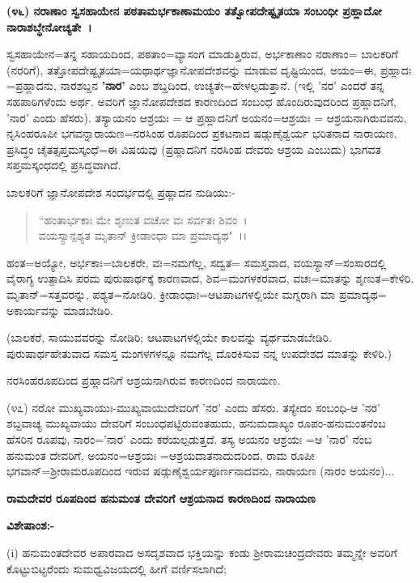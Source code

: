 \textbf{(೪೬) ನರಾಣಾಂ ಸ್ವಸಹಾಯೇನ ಪಠತಾಮರ್ಭಕಾಣಾಮಯಂ ತತ್ವೋಪದೇಷ್ಟೃತಯಾ ಸಂಬಂಧೀ ಪ್ರಹ್ಲಾದೋ ನಾರಾಶಬ್ಧೇನೋಚ್ಯತೇ~।}

ಸ್ವಸಹಾಯೇನ=ತನ್ನ ಸಹಾಯದಿಂದ, ಪಠತಾಂ=ವ್ಯಾಸಂಗ ಮಾಡುತ್ತಿರುವ, ಅರ್ಭಕಾಣಾಂ ನರಾಣಾಂ= ಬಾಲಕರಿಗೆ (ನರರಿಗೆ), ತತ್ತೋಪದೇಷ್ಟೃತಯಾ=ಯಥಾರ್ಥಜ್ಞಾನೋಪದೇಶವನ್ನು ಮಾಡುವ ದೃಷ್ಟಿಯಿಂದ, ಅಯಂ=ಈ, ಪ್ರಹ್ಲಾದಃ =ಪ್ರಹ್ಲಾದನು, ನಾರಶಬ್ದನ \textbf{'ನಾರ'} ಎಂಬ ಶಬ್ದದಿಂದ, ಉಚ್ಯತೇ=ಹೇಳಲ್ಪಡುತ್ತಾನೆ. (ಇಲ್ಲಿ 'ನರ' ಎಂದರೆ ತನ್ನ ಸಹಪಾಠಿಗಳೆಂದು ಅರ್ಥ. ಅವರಿಗೆ ಜ್ಞಾನೋಪದೇಶದ ಕಾರಣದಿಂದ ಸಂಬಂಧ ಹೊಂದಿರುವುದರಿಂದ ಪ್ರಹ್ಲಾದನಿಗೆ, 'ನಾರ' ಎಂದು ಹೆಸರು). ತಸ್ಯಾಯನಂ ಆಶ್ರಯಃ = ಆ ಪ್ರಹ್ಲಾದನಿಗೆ ಅಯನಂ=ಆಶ್ರಯಃ = ಆಶ್ರಯನಾಗಿರುವವನು, ನೃಸಿಂಹರೂಪೀ ಭಗವನ್ನಾರಾಯಣ=ನರಸಿಂಹ ರೂಪದಿಂದ ಪ್ರಕಟನಾದ ಷಡ್ಗುಣೈಶ್ವರ್ಯ ಭರಿತನಾದ ನಾರಾಯಣ. ಪ್ರಸಿದ್ಧಂ ಚೈತತ್ಸಪ್ತಮಸ್ಕಂಧೆ=ಈ ವಿಷಯವು (ಪ್ರಹ್ಲಾದನಿಗೆ ನರಸಿಂಹ ದೇವರು ಆಶ್ರಯ ಎಂಬುದು) ಭಾಗವತ ಸಪ್ತಮಸ್ಕಂಧದಲ್ಲಿ ಪ್ರಸಿದ್ಧವಾಗಿದೆ.

ಬಾಲಕರಿಗೆ ಜ್ಞಾನೋಪದೇಶ ಸಂದರ್ಭದಲ್ಲಿ ಪ್ರಹ್ಲಾದನ ನುಡಿಯು:-

\begin{verse}
``ಹಂತಾರ್ಭಕಾಃ ಮೇ ಶೃಣುತ ವಚೋ ವಃ ಸರ್ವತಃ ಶಿವಂ~।\\ ವಯಸ್ಯಾನ್ಪಶ್ಯತ ಮೃತಾನ್ ಕ್ರೀಡಾಂಧಾ ಮಾ ಪ್ರಮಾದ್ಯಥ"~।।
\end{verse}

ಹಂತ=ಅಯ್ಯೋ, ಅರ್ಭಕಾಃ=ಬಾಲಕರೇ, ವಃ=ನಮಗೆಲ್ಲ, ಸದ್ವತ= ಸಮಸ್ತವಾದ, ವಯಸ್ಯಾನ್=ಸಂಸಾರದಲ್ಲಿ ವೈರಾಗ್ಯ ಉತ್ಪಾದಿಸಿ ಪರಮ ಪುರುಷಾರ್ಥಕ್ಕೆ ಕಾರಣವಾದ, ಶಿವ=ಮಂಗಳಕರವಾದ, ವಚಃ=ಮಾತನ್ನು ಶೃಣುತ=ಕೇಳಿರಿ. ಮೃತಾನ್=ಸತ್ತವರನ್ನು, ಪಶ್ಯತ=ನೋಡಿರಿ. ಕ್ರೀಡಾಂಧಾಃ=ಆಟಪಾಟಗಳಲ್ಲಿಯೇ ಮಗ್ನರಾಗಿ ಮಾ ಪ್ರಮಾದ್ಯಥ= ಅಕಾರ್ಯವನ್ನು ಮಾಡಬೇಡಿರಿ.

(ಬಾಲಕರೆ, ಸಾಯುವವರನ್ನು ನೋಡಿರಿ; ಆಟಪಾಟಗಳಲ್ಲಿಯೇ ಕಾಲವನ್ನು ವ್ಯರ್ಥಮಾಡಬೇಡಿರಿ. ಪುರುಷಾರ್ಥಹೇತುವಾದ ಸಮಸ್ತ ಮಂಗಳಗಳನ್ನೂ ನಮಗೆಲ್ಲ ದೊರಕಿಸುವ ನನ್ನ ಉಪದೇಶದ ಮಾತನ್ನು ಕೇಳಿರಿ.)

ನರಸಿಂಹರೂಪದಿಂದ ಪ್ರಹ್ಲಾದನಿಗೆ ಆಶ್ರಯನಾಗಿರುವ ಕಾರಣದಿಂದ ನಾರಾಯಣ.

(೪೭) ನರೋ ಮುಖ್ಯವಾಯುಃ-ಮುಖ್ಯವಾಯುದೇವರಿಗೆ 'ನರ' ಎಂದು ಹೆಸರು. ತಸ್ಯೇದಂ ಸಂಬಂಧಿ-ಆ 'ನರ' ಶಬ್ದವಾಚ್ಯ ಮುಖ್ಯವಾಯು ದೇವರಿಗೆ ಸಂಬಂಧಪಟ್ಟಿರುವಂತಹುದು, ಹನುಮದಾಖ್ಯಂ ರೂಪಂ-ಹನುಮಂತನೆಂಬ ಹೆಸರಿನ ರೂಪವು, ನಾರಂ='ನಾರ' ಎಂದು ಕರೆಯಲ್ಪಡುತ್ತದೆ. ತಸ್ಯ ಅಯನಂ ಆಶ್ರಯಃ =ಆ 'ನಾರ' ನೆಂಬ ಹನುಮಂತ ದೇವರಿಗೆ, ಅಯನಂ=ಆಶ್ರಯಃ =ಆಶ್ರಯದಾತನಾದುದರಿಂದ, ರಾಮ ರೂಪೀ ಭಗವಾನ್=ಶ‍್ರೀರಾಮರೂಪದಿಂದ ಇರುವ ಷಡ್ಗುಣೈಶ್ವರ್ಯಪೂರ್ಣನಾದವನು, ನಾರಾಯಣ (ನಾರಂ ಅಯನಂ)...

\begin{center}
\textbf{ರಾಮದೇವರ ರೂಪದಿಂದ ಹನುಮಂತ ದೇವರಿಗೆ ಆಶ್ರಯನಾದ ಕಾರಣದಿಂದ ನಾರಾಯಣ}
\end{center}

\noindent
\textbf{ವಿಶೇಷಾಂಶ:-}

(i) ಹನುಮಂತದೇವರ ಅಪಾರವಾದ ಅಸದೃಶವಾದ ಭಕ್ತಿಯನ್ನು ಕಂಡು ಶ‍್ರೀರಾಮಚಂದ್ರದೇವರು ತಮ್ಮನ್ನೇ ಅವರಿಗೆ ಕೊಟ್ಟುಬಿಟ್ಟರೆಂದು ಸುಮಧ್ವವಿಜಯದಲ್ಲಿ ಹೀಗೆ ವರ್ಣಿಸಲಾಗಿದೆ;

